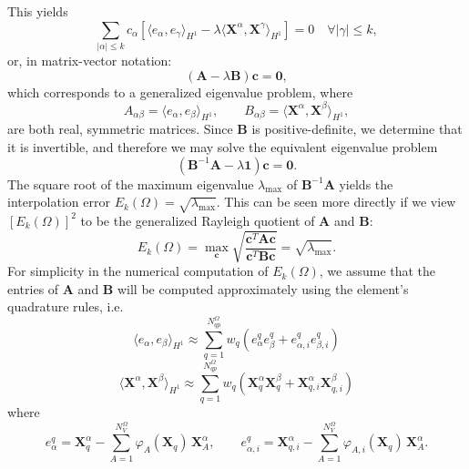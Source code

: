 This yields
\begin{equation}
        \sum_{|\alpha| \leq k} c_{\alpha} \left[ \langle e_\alpha, e_\gamma \rangle_{H^1} - \lambda \langle \mathbf{X}^\alpha, \mathbf{X}^\gamma \rangle_{H^1} \right] = 0 \quad \forall |\gamma| \leq k,
\end{equation}
or, in matrix-vector notation:
\begin{equation}
        (\mathbf{A} - \lambda \mathbf{B}) \mathbf{c} = \mathbf{0},
\end{equation}
which corresponds to a generalized eigenvalue problem, where
\begin{equation}
        A_{\alpha \beta} = \langle e_\alpha, e_\beta \rangle_{H^1}, \qquad B_{\alpha \beta} = \langle \mathbf{X}^\alpha, \mathbf{X}^\beta \rangle_{H^1},
\end{equation}
are both real, symmetric matrices. Since $\mathbf{B}$ is positive-definite, we determine that it is invertible, and therefore we may solve the equivalent eigenvalue problem
\begin{equation}
        (\mathbf{B}^{-1} \mathbf{A} - \lambda \mathbf{1}) \mathbf{c} = \mathbf{0}.
\end{equation}
The square root of the maximum eigenvalue $\lambda_{\max}$ of $\mathbf{B}^{-1} \mathbf{A}$ yields the interpolation error $E_k (\Omega) = \sqrt{\lambda_{\max}}$. This can be seen more directly if we view $\left[ E_k (\Omega) \right]^2$ to be the generalized Rayleigh quotient of $\mathbf{A}$ and $\mathbf{B}$:
\begin{equation}
        E_k (\Omega) = \max_{\mathbf{c}} \sqrt{\frac{\mathbf{c}^T \mathbf{A} \mathbf{c}}{\mathbf{c}^T \mathbf{B} \mathbf{c}}} = \sqrt{\lambda_{\max}}.
\end{equation}
For simplicity in the numerical computation of $E_k (\Omega)$, we assume that the entries of $\mathbf{A}$ and $\mathbf{B}$ will be computed approximately using the element's quadrature rules, i.e.
\begin{equation}
        \langle e_\alpha, e_\beta \rangle_{H^1} \approx \sum_{q=1}^{N^{\Omega}_{qp}} w_q (e_{\alpha}^{q} e_{\beta}^{q} + e_{\alpha,i}^{q} e_{\beta,i}^{q})
\end{equation}
\begin{equation}
        \langle \mathbf{X}^\alpha, \mathbf{X}^\beta \rangle_{H^1} \approx \sum_{q=1}^{N^{\Omega}_{qp}} w_q (\mathbf{X}^{\alpha}_{q} \mathbf{X}^{\beta}_{q} + \mathbf{X}^{\alpha}_{q,i} \mathbf{X}^{\beta}_{q,i})
\end{equation}
where
\begin{equation}
        e_{\alpha}^{q} = \mathbf{X}^{\alpha}_{q} - \sum_{A = 1}^{N^{\Omega}_V} \varphi_A (\mathbf{X}_{q}) \, \mathbf{X}_A^{\alpha}, \qquad e_{\alpha,i}^{q} = \mathbf{X}^{\alpha}_{q,i} - \sum_{A = 1}^{N^{\Omega}_V} \varphi_{A,i} (\mathbf{X}_{q}) \, \mathbf{X}_A^{\alpha}.
\end{equation}


